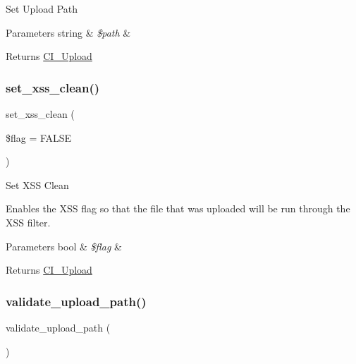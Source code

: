 Set Upload Path


\begin{DoxyParams}[1]{Parameters}
string & {\em \$path} & \\
\hline
\end{DoxyParams}
\begin{DoxyReturn}{Returns}
\mbox{\hyperlink{class_c_i___upload}{C\+I\+\_\+\+Upload}} 
\end{DoxyReturn}
\mbox{\label{class_c_i___upload_a5556024223414507d84d221862919212}} 
\subsubsection{\texorpdfstring{set\+\_\+xss\+\_\+clean()}{set\_xss\_clean()}}
{\footnotesize\ttfamily set\+\_\+xss\+\_\+clean (\begin{DoxyParamCaption}\item[{}]{\$flag = {\ttfamily FALSE} }\end{DoxyParamCaption})}

Set X\+SS Clean

Enables the X\+SS flag so that the file that was uploaded will be run through the X\+SS filter.


\begin{DoxyParams}[1]{Parameters}
bool & {\em \$flag} & \\
\hline
\end{DoxyParams}
\begin{DoxyReturn}{Returns}
\mbox{\hyperlink{class_c_i___upload}{C\+I\+\_\+\+Upload}} 
\end{DoxyReturn}
\mbox{\label{class_c_i___upload_a067f092935018f0d1fbfa955ddecfee3}} 
\subsubsection{\texorpdfstring{validate\+\_\+upload\+\_\+path()}{validate\_upload\_path()}}
{\footnotesize\ttfamily validate\+\_\+upload\+\_\+path (\begin{DoxyParamCaption}{ }\end{DoxyParamCaption})}

